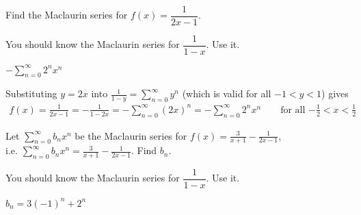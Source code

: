 
\begin{Mquestion}[M105 2013A]\label{prob_s3.6modify1}
Find the Maclaurin series for $f(x) = \dfrac{1}{2x-1}$.
\end{Mquestion}

\begin{hint}
You should know the Maclaurin series for $\dfrac{1}{1-x}$. Use it.
\end{hint}

\begin{answer}
$\displaystyle-\sum\limits_{n=0}^\infty 2^nx^n$
\end{answer}

\begin{solution}
Substituting $y=2x$ into $\displaystyle \frac{1}{1-y} = \sum\limits_{n=0}^\infty y^n$ (which is valid for all $-1<y<1$)
gives
\begin{align*}
f(x) = \frac{1}{2x-1} = -\frac{1}{1-2x}
=-\sum_{n=0}^\infty (2x)^n
=-\sum_{n=0}^\infty 2^nx^n
\qquad\text{for all $-\tfrac{1}{2}<x<\tfrac{1}{2}$}
\end{align*}
\end{solution}

\begin{question}[M105 2014A]
Let $\displaystyle\sum\limits_{n=0}^\infty b_nx^n$
be the Maclaurin series for $\displaystyle f(x) = \frac{3}{x+1} - \frac{1}{2x-1}$,\\
i.e. $\displaystyle\sum\limits_{n=0}^\infty b_nx^n = \frac{3}{x+1} - \frac{1}{2x-1}$.
Find $b_n$.
\end{question}

\begin{hint}
You should know the Maclaurin series for $\dfrac{1}{1-x}$. Use it.
\end{hint}

\begin{answer}
$b_n = 3(-1)^n + 2^n$
\end{answer}

